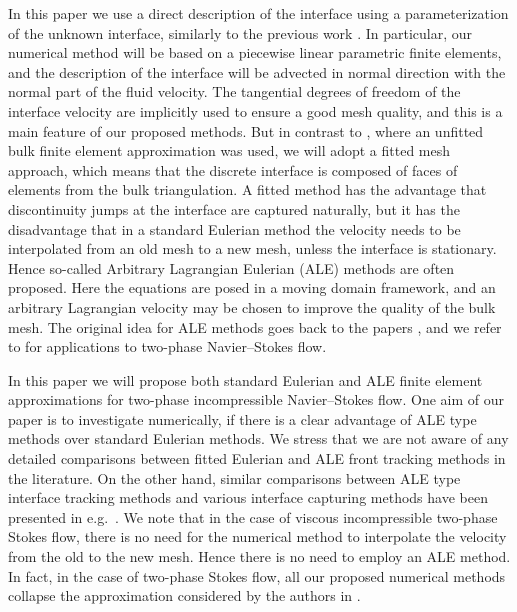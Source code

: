 \documentclass[a4paper,12pt,onecolumn]{article}
\begin{document}
In this paper we use a direct description of the interface using a
parameterization of the unknown interface, similarly to the previous work
\cite{fluidfbp}. In particular, our numerical method will be based
on a piecewise linear parametric finite elements, and the description of the
interface will be advected in normal direction
with the normal part of the fluid velocity. The tangential degrees
of freedom of the interface velocity are implicitly used to ensure a
good mesh quality, and this is a main feature of our proposed methods.
But in contrast to \cite{fluidfbp}, where an unfitted bulk finite element
approximation was used, we will adopt a fitted mesh approach, which means
that the discrete interface is composed of faces of elements from the bulk
triangulation. A fitted method has the advantage that discontinuity jumps
at the interface are captured naturally, but it has the disadvantage that in
a standard Eulerian method the velocity needs to be interpolated from
an old mesh to a new mesh, unless the interface is stationary. Hence so-called
Arbitrary Lagrangian Eulerian (ALE) methods are often proposed. Here
the equations are posed in a moving domain framework,
and an arbitrary Lagrangian velocity may be chosen to improve the quality of
the bulk mesh. The original idea for ALE methods goes back to
the papers \cite{Donea83,Hughes81}, and we refer to
\cite{Nobile99,NobilePhd,Formaggia04,Ganesan06,GanesanT08,HahnHT13,%
GanesanHST17} for applications to two-phase Navier--Stokes flow.

In this paper we will propose both standard Eulerian and
ALE finite element approximations for two-phase incompressible Navier--Stokes
flow. One aim of our paper is to investigate numerically, if there is a clear
advantage of ALE type methods over standard Eulerian methods.
We stress that we are not aware of any detailed comparisons between fitted
Eulerian and ALE front tracking methods in the literature.
On the other hand, similar
comparisons between ALE type interface tracking methods and various
interface capturing methods have been presented in e.g.\
\cite{HysingTKPBGT09,ElgetiS16}.
We note that in the case of viscous incompressible two-phase Stokes flow,
there is no need for the numerical method to interpolate the velocity from the
old to the new mesh. Hence there is no need to employ an ALE method. In fact,
in the case of two-phase Stokes flow, all our proposed numerical methods
collapse the approximation considered by the authors in \cite{stokesfitted}.
\end{document}
